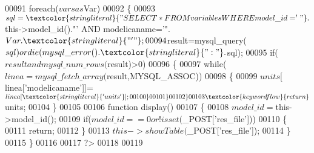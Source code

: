 \begin{DoxyCode}
00091     \textcolor{keywordflow}{foreach}($vars as $Var)
00092     \{
00093       $sql=\textcolor{stringliteral}{"SELECT * FROM variables WHERE model\_id='"}.$this->model\_id().\textcolor{stringliteral}{"' AND
       modelicaname='"}.$Var.\textcolor{stringliteral}{"'"};
00094       $result=mysql\_query($sql) or die(mysql\_error().\textcolor{stringliteral}{": "}.$sql);
00095       \textcolor{keywordflow}{if}($result and mysql\_num\_rows($result)>0)
00096       \{
00097         \textcolor{keywordflow}{while}($linea=mysql\_fetch\_array($result,MYSQL\_ASSOC))
00098         \{
00099           $units[$linea[\textcolor{stringliteral}{'modelicaname'}]]=$linea[\textcolor{stringliteral}{'units'}];
00100         \}
00101       \}
00102     \}
00103     \textcolor{keywordflow}{return} $units;
00104   \}
00105 
00106   \textcolor{keyword}{function} display()
00107   \{
00108     $model\_id=$this->model\_id();
00109     \textcolor{keywordflow}{if}($model\_id==0 or !isset($\_POST[\textcolor{stringliteral}{'res\_file'}]))
00110     \{
00111       \textcolor{keywordflow}{return};
00112     \}
00113     $this->showTable($\_POST[\textcolor{stringliteral}{'res\_file'}]);
00114   \}
00115 \}
00116 
00117 ?>
00118 
00119 
\end{DoxyCode}
